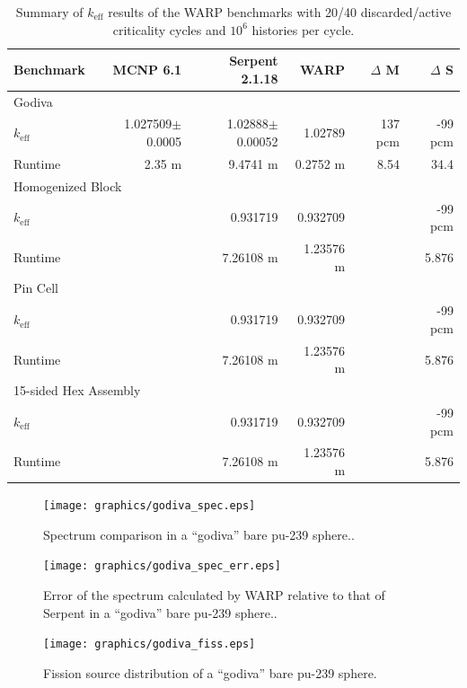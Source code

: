 \begin{table}[h]
\centering
\caption{Summary of $k_\mathrm{eff}$ results of the WARP benchmarks with 20/40 discarded/active criticality cycles and $10^6$ histories per cycle.}
\label{benchmark_summary}
\begin{tabular}{| l | r | r | r | r | r |}
 \hline
 Benchmark & MCNP 6.1 & Serpent 2.1.18 & WARP & $\Delta$ M & $\Delta$ S  \\
\hline
\hline
\multicolumn{6}{|l|}{Godiva}  \\
\hline
 $k_\mathrm{eff}$ & 1.027509$\pm$0.0005 & 1.02888$\pm$0.00052 & 1.02789 & 137 pcm & -99 pcm  \\
 \hline
 Runtime               & 2.35 m & 9.4741 m & 0.2752 m & 8.54  & 34.4  \\
 \hline
 \hline
\multicolumn{6}{|l|}{Homogenized Block }\\
\hline
 $k_\mathrm{eff}$ & & 0.931719 & 0.932709 & & -99 pcm   \\
 \hline
 Runtime               & & 7.26108 m & 1.23576 m & & 5.876 \\
 \hline
  \hline
\multicolumn{6}{|l|}{Pin Cell}\\
\hline
 $k_\mathrm{eff}$ & & 0.931719 & 0.932709 & & -99 pcm    \\
 \hline
 Runtime               & & 7.26108 m & 1.23576 m & & 5.876  \\
 \hline
  \hline
\multicolumn{6}{|l|}{15-sided Hex Assembly}\\
\hline
 $k_\mathrm{eff}$ & & 0.931719 & 0.932709 & & -99 pcm  \\
 \hline
 Runtime               & & 7.26108 m & 1.23576 m  & & 5.876 \\
 \hline
\end{tabular}
\end{table}

\begin{figure}[h!] 
\centering
\texttt{[image: graphics/godiva\_spec.eps]}
\caption{Spectrum comparison in a ``godiva'' bare pu-239 sphere.. \label{godiva_spec} }
\end{figure}

\begin{figure}[h!] 
\centering
\texttt{[image: graphics/godiva\_spec\_err.eps]}
\caption{Error of the spectrum calculated by WARP relative to that of Serpent in a ``godiva'' bare pu-239 sphere.. \label{godiva_spec_err} }
\end{figure}

\begin{figure}[h!] 
\centering
\texttt{[image: graphics/godiva\_fiss.eps]}
\caption{Fission source distribution of a ``godiva'' bare pu-239 sphere. \label{godiva_fiss} }
\end{figure}

